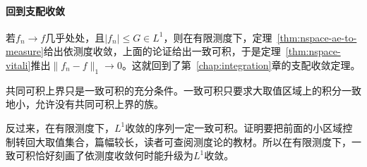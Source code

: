 \paragraph{回到支配收敛}
若$f_n\to f$几乎处处，且$\lvert f_n\rvert\leq G\in L^1$，则在有限测度下，定理~\ref{thm:nspace-ae-to-measure}给出依测度收敛，上面的论证给出一致可积，于是定理~\ref{thm:nspace-vitali}推出$\lVert f_n-f\rVert_1\to0$。这就回到了第~\ref{chap:integration}章的支配收敛定理。

共同可积上界只是一致可积的充分条件。一致可积只要求大取值区域上的积分一致地小，允许没有共同可积上界的族。

反过来，在有限测度下，$L^1$收敛的序列一定一致可积。证明要把前面的小区域控制转回大取值集合，篇幅较长，读者可查阅测度论的教材。所以在有限测度下，一致可积恰好刻画了依测度收敛何时能升级为$L^1$收敛。
